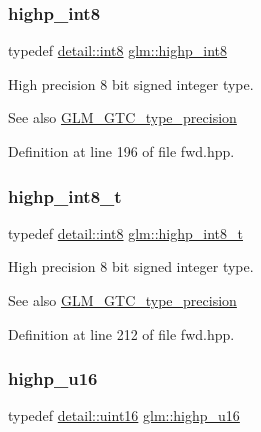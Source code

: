 \subsubsection{\texorpdfstring{highp\_int8}{highp\_int8}}
{\footnotesize\ttfamily typedef \mbox{\hyperlink{namespaceglm_1_1detail_a04b526a8d7a9b455602a0afa78c531e0}{detail\+::int8}} \mbox{\hyperlink{group__gtc__type__precision_ga57c86999e666760c304453f9bfdc09d1}{glm\+::highp\+\_\+int8}}}

High precision 8 bit signed integer type. \begin{DoxySeeAlso}{See also}
\mbox{\hyperlink{group__gtc__type__precision}{G\+L\+M\+\_\+\+G\+T\+C\+\_\+type\+\_\+precision}} 
\end{DoxySeeAlso}


Definition at line 196 of file fwd.\+hpp.

\mbox{\label{group__gtc__type__precision_ga417701b99e6e7992f35ab2ef694f88b2}} 
\subsubsection{\texorpdfstring{highp\_int8\_t}{highp\_int8\_t}}
{\footnotesize\ttfamily typedef \mbox{\hyperlink{namespaceglm_1_1detail_a04b526a8d7a9b455602a0afa78c531e0}{detail\+::int8}} \mbox{\hyperlink{group__gtc__type__precision_ga417701b99e6e7992f35ab2ef694f88b2}{glm\+::highp\+\_\+int8\+\_\+t}}}

High precision 8 bit signed integer type. \begin{DoxySeeAlso}{See also}
\mbox{\hyperlink{group__gtc__type__precision}{G\+L\+M\+\_\+\+G\+T\+C\+\_\+type\+\_\+precision}} 
\end{DoxySeeAlso}


Definition at line 212 of file fwd.\+hpp.

\mbox{\label{group__gtc__type__precision_ga9da2178d7501d9c0f225fa1a7b70cb45}} 
\subsubsection{\texorpdfstring{highp\_u16}{highp\_u16}}
{\footnotesize\ttfamily typedef \mbox{\hyperlink{namespaceglm_1_1detail_a47b2a7d006d187338e8031a352d1ce56}{detail\+::uint16}} \mbox{\hyperlink{group__gtc__type__precision_ga9da2178d7501d9c0f225fa1a7b70cb45}{glm\+::highp\+\_\+u16}}}

